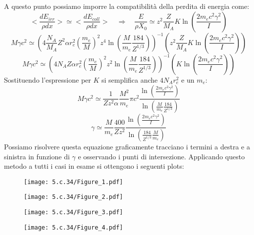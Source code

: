 \documentclass[twoside]{article}
\begin{document}
A questo punto possiamo imporre la compatibilità della perdita di energia come:
\begin{equation}
    <\frac{dE_{irr}}{\rho dx}>\simeq<\frac{dE_{coll}}{\rho dx}>\quad\Rightarrow\quad\frac{E}{\rho X_0}\simeq z^2 \frac{Z}{M_A} K \ln\left(\frac{2m_ec^2\gamma^2}{I} \right)
\end{equation}
\begin{equation}
    M\gamma c^2\simeq\left(4\frac{N_A}{M_A}Z^2\alpha r_e^2\left(\frac{m_e}{M}\right)^2z^4\ln(\frac{M}{m_e}\frac{184}{Z^{1/3}})\right)^{-1}\left( z^2 \frac{Z}{M_A} K \ln\left(\frac{2m_ec^2\gamma^2}{I} \right)\right)
\end{equation}
\begin{equation}
    M\gamma c^2\simeq\left(4N_A Z\alpha r_e^2\left(\frac{m_e}{M}\right)^2z^2\ln(\frac{M}{m_e}\frac{184}{Z^{1/3}})\right)^{-1}\left(  K \ln\left(\frac{2m_ec^2\gamma^2}{I} \right)\right)
\end{equation}
Sostituendo l'espressione per $K$ si semplifica anche $4N_Ar_e^2$ e un $m_e$:
\begin{equation}
    M\gamma c^2\simeq\frac{1}{Zz^2\alpha}\frac{M^2}{m_e}  \pi c^2\frac{\ln\left(\frac{2m_ec^2\gamma^2}{I} \right)}{\ln(\frac{M}{m_e}\frac{184}{Z^{1/3}})}
\end{equation}
\begin{equation}
    \gamma\simeq\frac{M}{m_e}\frac{400}{Zz^2}\frac{\ln\left(\frac{2m_ec^2\gamma^2}{I} \right)}{\ln\left(\frac{184}{Z^{1/3}}\frac{M}{m_e}\right)}
\end{equation}
Possiamo risolvere questa equazione graficamente tracciano i termini a destra e a sinistra in funzione di $\gamma$ e osservando i punti di intersezione. Applicando questo metodo a tutti i casi in esame si ottengono i seguenti plots:
\begin{figure}[H]
    \centering
    \texttt{[image: 5.c.34/Figure\_1.pdf]}
    \label{elettrone_pb}
\end{figure}
\begin{figure}[H]
    \centering
    \texttt{[image: 5.c.34/Figure\_2.pdf]}
    \label{protone_pb}
\end{figure}
\begin{figure}[H]
    \centering
    \texttt{[image: 5.c.34/Figure\_3.pdf]}
    \label{elettrone_N}
\end{figure}
\begin{figure}[H]
    \centering
    \texttt{[image: 5.c.34/Figure\_4.pdf]}
    \label{protone_N}
\end{figure}
\end{document}

